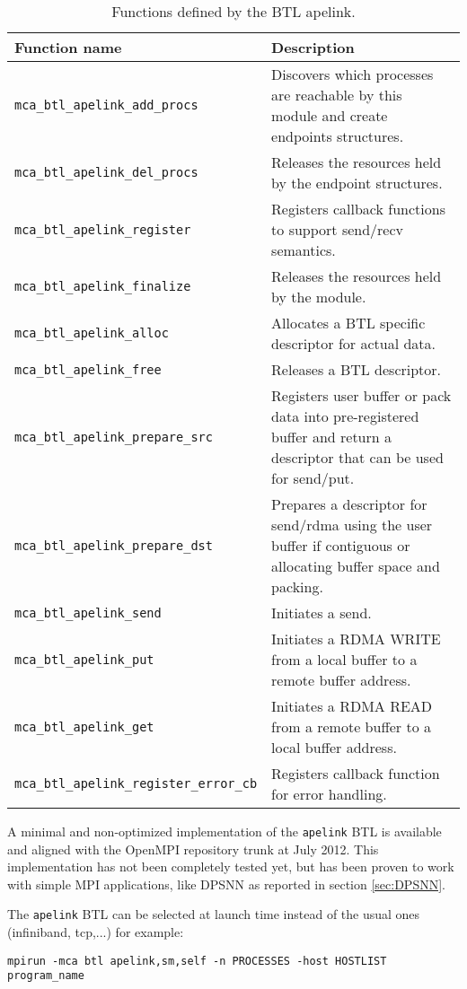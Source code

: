 \begin{table}[!htb]
\centering
\setlength\extrarowheight{3pt}
\begin{tabular}{|l|p{9cm}|}
\hline
Function name & Description\\
\hline
\texttt{mca\_btl\_apelink\_add\_procs} & Discovers which processes are reachable by this module and create endpoints structures.\\
\texttt{mca\_btl\_apelink\_del\_procs} & Releases the resources held by the endpoint structures.\\
\texttt{mca\_btl\_apelink\_register} & Registers callback functions to support send/recv semantics.\\ 
\texttt{mca\_btl\_apelink\_finalize} & Releases the resources held by the module.\\
\texttt{mca\_btl\_apelink\_alloc} & Allocates a BTL specific descriptor for actual data.\\
\texttt{mca\_btl\_apelink\_free} &  Releases a BTL descriptor.\\
\texttt{mca\_btl\_apelink\_prepare\_src} & Registers user buffer or pack data into pre-registered buffer and return a descriptor that can be used for send/put.\\
\texttt{mca\_btl\_apelink\_prepare\_dst} &  Prepares a descriptor for send/rdma using the user buffer if contiguous or allocating buffer space and packing.\\
\texttt{mca\_btl\_apelink\_send} & Initiates a send.\\
\texttt{mca\_btl\_apelink\_put} & Initiates a RDMA WRITE from a local buffer to a remote buffer address.\\
\texttt{mca\_btl\_apelink\_get} & Initiates a RDMA READ from a remote buffer to a local buffer address.\\
\texttt{mca\_btl\_apelink\_register\_error\_cb} & Registers callback function for error handling.\\
\hline       
\end{tabular}
\caption{Functions defined by the BTL apelink.}
\label{tab:btlapelink}
\end{table}

A minimal and non-optimized implementation of the \texttt{apelink} BTL
is available and aligned with the OpenMPI repository trunk at July
2012.  This implementation has not been completely tested yet, but has
been proven to work with simple MPI applications, like DPSNN as
reported in section \ref{sec:DPSNN}.

The \texttt{apelink} BTL can be
selected at launch time instead of the usual ones (infiniband,
tcp,...) for example:
\begin{verbatim}
mpirun -mca btl apelink,sm,self -n PROCESSES -host HOSTLIST program_name
\end{verbatim}

